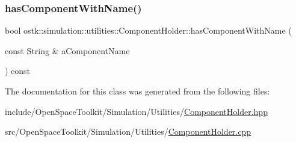 \mbox{\label{classostk_1_1simulation_1_1utilities_1_1_component_holder_a74f0c97edae7bd4e8cf626749374aa3b}} 
\subsubsection{\texorpdfstring{has\+Component\+With\+Name()}{hasComponentWithName()}}
{\footnotesize\ttfamily bool ostk\+::simulation\+::utilities\+::\+Component\+Holder\+::has\+Component\+With\+Name (\begin{DoxyParamCaption}\item[{const String \&}]{a\+Component\+Name }\end{DoxyParamCaption}) const}



The documentation for this class was generated from the following files\+:\begin{DoxyCompactItemize}
\item 
include/\+Open\+Space\+Toolkit/\+Simulation/\+Utilities/\hyperlink{_component_holder_8hpp}{Component\+Holder.\+hpp}\item 
src/\+Open\+Space\+Toolkit/\+Simulation/\+Utilities/\hyperlink{_component_holder_8cpp}{Component\+Holder.\+cpp}\end{DoxyCompactItemize}
